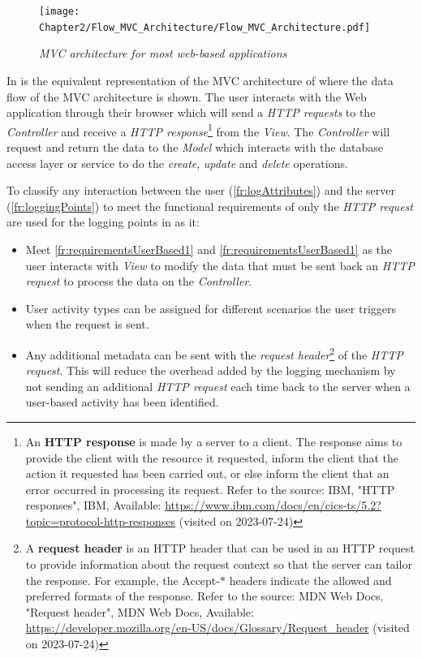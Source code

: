 \begin{figure}[!htb]
	\centering %
	\texttt{[image: Chapter2/Flow\_MVC\_Architecture/Flow\_MVC\_Architecture.pdf]}
	\caption[MVC architecture for most web-based applications]
	{\textit{MVC architecture for most web-based applications \cite{Gu2010}}}\label{fig:ch2_flowMVC_Architecture}
\end{figure}

In  is the equivalent representation of the MVC architecture of  where the data flow of the MVC architecture is shown. The user interacts with the Web application through their browser which will send a \textit{HTTP requests} to the \textit{Controller} and receive a \textit{HTTP response}\footnote{An \textbf{HTTP response} is made by a server to a client. The response aims to provide the client with the resource it requested, inform the client that the action it requested has been carried out, or else inform the client that an error occurred in processing its request. Refer to the source: IBM, "HTTP responses", IBM, Available: \url{https://www.ibm.com/docs/en/cics-ts/5.2?topic=protocol-http-responses} (visited on 2023-07-24)} from the \textit{View}. The \textit{Controller} will request and return the data to the \textit{Model} which interacts with the database access layer or service to do the \textit{create}, \textit{update} and \textit{delete} operations.\par To classify any interaction between the user (\ref{fr:logAttributes}) and the server (\ref{fr:loggingPoints}) to meet the functional requirements of  only the \textit{HTTP request} are used for the logging points in  as it:

\begin{itemize}
	\item Meet \ref{fr:requirementsUserBased1} and \ref{fr:requirementsUserBased1} as the user interacts with \textit{ View} to modify the data that must be sent back an \textit{HTTP request} to process the data on the \textit{Controller}.
	\item User activity types can be assigned for different scenarios the user triggers when the request is sent. 
	\item Any additional metadata can be sent with the \textit{request header}\footnote{A \textbf{request header} is an HTTP header that can be used in an HTTP request to provide information about the request context so that the server can tailor the response. For example, the Accept-$\ast$ headers indicate the allowed and preferred formats of the response. Refer to the source: MDN Web Docs, "Request header", MDN Web Docs, Available: \url{https://developer.mozilla.org/en-US/docs/Glossary/Request_header} (visited on 2023-07-24)} of the \textit{HTTP request}. This will reduce the overhead added by the logging mechanism by not sending an additional \textit{HTTP request} each time back to the server when a user-based activity has been identified.
\end{itemize}

